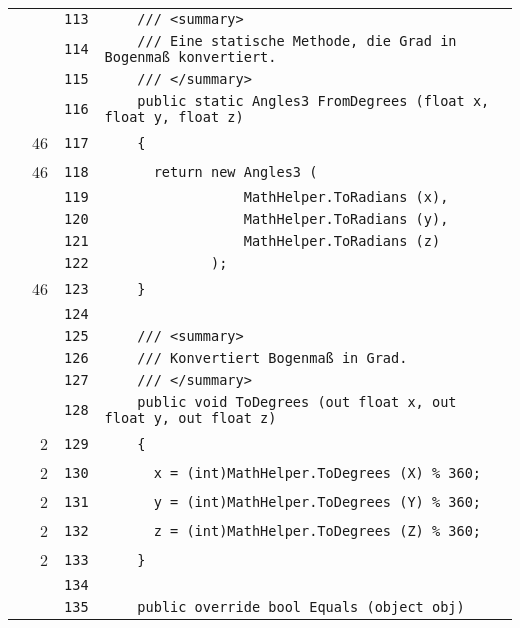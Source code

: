 \documentclass[a4paper,10pt]{article}
\begin{document}
\begin{longtable}[l]{lrrl}
\cellcolor{gray} &  & \verb~113~ & \verb~    /// <summary>~\\
\cellcolor{gray} &  & \verb~114~ & \verb~    /// Eine statische Methode, die Grad in Bogenmaß konvertiert.~\\
\cellcolor{gray} &  & \verb~115~ & \verb~    /// </summary>~\\
\cellcolor{gray} &  & \verb~116~ & \verb~    public static Angles3 FromDegrees (float x, float y, float z)~\\
\cellcolor{green} & 46 & \verb~117~ & \verb~    {~\\
\cellcolor{green} & 46 & \verb~118~ & \verb~      return new Angles3 (~\\
\cellcolor{gray} &  & \verb~119~ & \verb~                 MathHelper.ToRadians (x),~\\
\cellcolor{gray} &  & \verb~120~ & \verb~                 MathHelper.ToRadians (y),~\\
\cellcolor{gray} &  & \verb~121~ & \verb~                 MathHelper.ToRadians (z)~\\
\cellcolor{gray} &  & \verb~122~ & \verb~             );~\\
\cellcolor{green} & 46 & \verb~123~ & \verb~    }~\\
\cellcolor{gray} &  & \verb~124~ & \verb~~\\
\cellcolor{gray} &  & \verb~125~ & \verb~    /// <summary>~\\
\cellcolor{gray} &  & \verb~126~ & \verb~    /// Konvertiert Bogenmaß in Grad.~\\
\cellcolor{gray} &  & \verb~127~ & \verb~    /// </summary>~\\
\cellcolor{gray} &  & \verb~128~ & \verb~    public void ToDegrees (out float x, out float y, out float z)~\\
\cellcolor{green} & 2 & \verb~129~ & \verb~    {~\\
\cellcolor{green} & 2 & \verb~130~ & \verb~      x = (int)MathHelper.ToDegrees (X) % 360;~\\
\cellcolor{green} & 2 & \verb~131~ & \verb~      y = (int)MathHelper.ToDegrees (Y) % 360;~\\
\cellcolor{green} & 2 & \verb~132~ & \verb~      z = (int)MathHelper.ToDegrees (Z) % 360;~\\
\cellcolor{green} & 2 & \verb~133~ & \verb~    }~\\
\cellcolor{gray} &  & \verb~134~ & \verb~~\\
\cellcolor{gray} &  & \verb~135~ & \verb~    public override bool Equals (object obj)~\\

\end{longtable}
\end{document}
